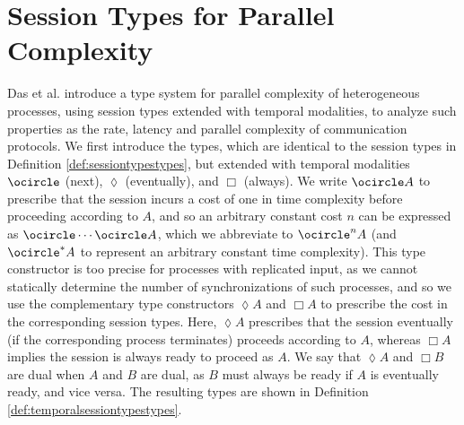\section{Session Types for Parallel Complexity}\label{sec:SessionTypesSystem}

Das et al. \cite{DasEtAl2018} introduce a type system for parallel complexity of heterogeneous processes, using session types extended with temporal modalities, to analyze such properties as the rate, latency and parallel complexity of communication protocols. We first introduce the types, which are identical to the session types in Definition \ref{def:sessiontypestypes}, but extended with temporal modalities $\ocircle$ (next), $\lozenge$ (eventually), and $\Box$ (always). We write $\ocircle A$ to prescribe that the session incurs a cost of one in time complexity before proceeding according to $A$, and so an arbitrary constant cost $n$ can be expressed as $\ocircle\cdots\ocircle A$, which we abbreviate to $\ocircle^n A$ (and $\ocircle^* A$ to represent an arbitrary constant time complexity). This type constructor is too precise for processes with replicated input, as we cannot statically determine the number of synchronizations of such processes, and so we use the complementary type constructors $\lozenge A$ and $\Box A$ to prescribe the cost in the corresponding session types. Here, $\lozenge A$ prescribes that the session eventually (if the corresponding process terminates) proceeds according to $A$, whereas $\Box A$ implies the session is always ready to proceed as $A$. We say that $\lozenge A$ and $\Box B$ are dual when $A$ and $B$ are dual, as $B$ must always be ready if $A$ is eventually ready, and vice versa. The resulting types are shown in Definition \ref{def:temporalsessiontypestypes}.

